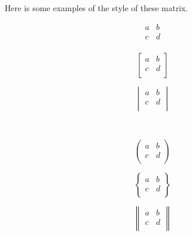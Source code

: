 \begin{frame}
	Here is some examples of the style of these matrix.
	\begin{example}
		\begin{minipage}{0.3\linewidth}
			\centering {}
			$$\begin{matrix}a&b\\c&d\\\end{matrix}$$
		\end{minipage}
		\hfill
		\begin{minipage}{0.3\linewidth}
			\centering {}
			$$\begin{bmatrix}a&b\\c&d\\\end{bmatrix}$$
		\end{minipage}
		\hfill
		\begin{minipage}{0.3\linewidth}
			\centering {}
			$$\begin{vmatrix}a&b\\c&d\\\end{vmatrix}$$
		\end{minipage}
		\vfill
		\ \\[1em]
		\begin{minipage}{0.3\linewidth}
			\centering {}
			$$\begin{pmatrix}a&b\\c&d\\\end{pmatrix}$$
		\end{minipage}
		\hfill
		\begin{minipage}{0.3\linewidth}
			\centering {}
			$$\begin{Bmatrix}a&b\\c&d\\\end{Bmatrix}$$
		\end{minipage}
		\hfill
		\begin{minipage}{0.3\linewidth}
			\centering {}
			$$\begin{Vmatrix}a&b\\c&d\\\end{Vmatrix}$$
		\end{minipage}
	\end{example}
\end{frame}
